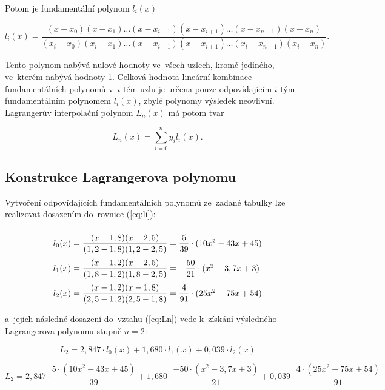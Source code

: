 \documentclass[a4paper,10pt]{article}
\begin{document}
\par Potom je fundamentální polynom $l_i(x)$

\begin{equation}
\label{eq:li}
l_i(x)=\dfrac{(x-x_0)(x-x_1)\dots(x-x_{i-1})(x-x_{i+1})\dots(x-x_{n-1})(x-x_n)}
{(x_i-x_0)(x_i-x_1)\dots(x-x_{i-1})(x-x_{i+1})\dots(x_i-x_{n-1})(x_i-x_n)}.
\end{equation}

\par Tento polynom nabývá nulové hodnoty ve~všech uzlech, kromě jediného, ve~kterém
nabývá hodnoty 1. Celková hodnota lineární kombinace fundamentálních polynomů v~$i$-tém
uzlu je určena pouze odpovídajícím $i$-tým fundamentálním polynomem $l_i(x)$, zbylé
polynomy výsledek neovlivní. Lagrangerův interpolační polynom $L_n(x)$ má potom tvar

\begin{equation}
\label{eq:Ln}
L_n(x)=\sum_{i=0}^{n}y_{i}l_{i}(x).
\end{equation}

\subsection{Konstrukce Lagrangerova polynomu}
\par Vytvoření odpovídajících fundamentálních polynomů ze~zadané tabulky lze realizovat
dosazením do~rovnice (\ref{eq:li}):

\[\arraycolsep=1.4pt\def\arraystretch{2.4}
\begin{array}{cclcl}
l_0(x)&=&\dfrac{(x-1,8)(x-2,5)}{(1,2-1,8)(1,2-2,5)}&=&\dfrac{5}{39}\cdot(10x^2-43x+45)\\
l_1(x)&=&\dfrac{(x-1,2)(x-2,5)}{(1,8-1,2)(1,8-2,5)}&=&-\dfrac{50}{21}\cdot(x^2-3,7x+3)\\
l_2(x)&=&\dfrac{(x-1,2)(x-1,8)}{(2,5-1,2)(2,5-1,8)}&=&\dfrac{4}{91}\cdot(25x^2-75x+54)\\
\end{array}
\]

\newpage
\par a~jejich následné dosazení do~vztahu (\ref{eq:Ln}) vede k~získání výsledného
Lagrangerova polynomu stupně $n=2$:

\[
L_2=2,847\cdot{l_0(x)}+1,680\cdot{l_1(x)}+0,039\cdot{l_2(x)}
\]

\[
L_2 = 2,847\cdot\dfrac{5\cdot(10x^2-43x+45)}{39}
+1,680\cdot\dfrac{-50\cdot(x^2-3,7x+3)}{21}
+0,039\cdot\dfrac{4\cdot(25x^2-75x+54)}{91}
\]\\
\end{document}
